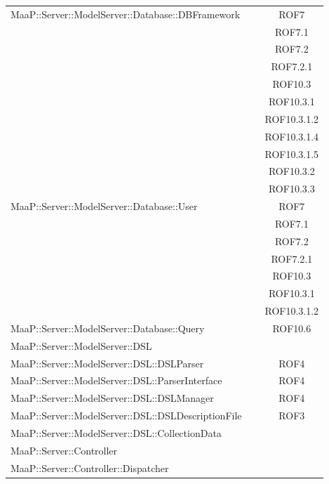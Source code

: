 \begin{center}
\begin{longtable}{|p{0.8\linewidth}|c|}
\midrule
MaaP::Server::ModelServer::Database::DBFramework
& ROF7\\
& ROF7.1\\
& ROF7.2\\
& ROF7.2.1\\
& ROF10.3\\
& ROF10.3.1\\
& ROF10.3.1.2\\
& ROF10.3.1.4\\
& ROF10.3.1.5\\
& ROF10.3.2\\
& ROF10.3.3\\


\midrule
MaaP::Server::ModelServer::Database::User
& ROF7\\
& ROF7.1\\
& ROF7.2\\
& ROF7.2.1\\
& ROF10.3\\
& ROF10.3.1\\
& ROF10.3.1.2\\

\midrule
MaaP::Server::ModelServer::Database::Query
& ROF10.6\\

\midrule
MaaP::Server::ModelServer::DSL
& \\

\midrule
MaaP::Server::ModelServer::DSL::DSLParser
& ROF4\\

\midrule
MaaP::Server::ModelServer::DSL::ParserInterface
& ROF4\\

\midrule
MaaP::Server::ModelServer::DSL::DSLManager
& ROF4\\

\midrule
MaaP::Server::ModelServer::DSL::DSLDescriptionFile
& ROF3\\

\midrule
MaaP::Server::ModelServer::DSL::CollectionData
& \\

\midrule
MaaP::Server::Controller
& \\

\midrule
MaaP::Server::Controller::Dispatcher
& \\


\end{longtable}
\end{center}
